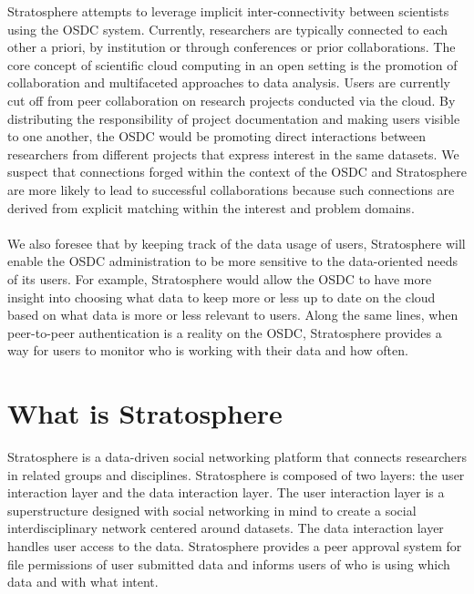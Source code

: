 \begin{multicols*}{2}
Stratosphere attempts to leverage implicit inter-connectivity between
scientists using the OSDC system. Currently, researchers are typically
connected to each other a priori, by institution or through
conferences or prior collaborations. The core concept of scientific
cloud computing in an open setting is the promotion of collaboration
and multifaceted approaches to data analysis. Users are currently cut
off from peer collaboration on research projects conducted via the
cloud. By distributing the responsibility of project documentation and
making users visible to one another, the OSDC would be promoting
direct interactions between researchers from different projects that
express interest in the same datasets. We suspect that connections
forged within the context of the OSDC and Stratosphere are more likely to lead to
successful collaborations because such connections are derived from
explicit matching within the interest and problem domains.
\\
\\
We also foresee that by keeping track of the data usage of users,
Stratosphere will enable the OSDC administration to be more sensitive to the
data-oriented needs of its users. For example, Stratosphere would allow the
OSDC to have more insight into choosing what data to keep more or less
up to date on the cloud based on what data is more or less relevant to users.
Along the same lines, when peer-to-peer authentication is a reality on
the OSDC, Stratosphere provides a way for users to monitor who is
working with their data and how often. 

\section{What is Stratosphere}
\label{sec:what}

Stratosphere is a data-driven social networking platform that connects
researchers in related groups and disciplines. Stratosphere is
composed of two layers: the user interaction layer and the data
interaction layer. The user interaction layer is a superstructure
designed with social networking in mind to create a social
interdisciplinary network centered around datasets. The data
interaction layer handles user access to the data. Stratosphere
provides a peer approval system for file permissions of user submitted
data and informs users of who is using which data and with what
intent.
\vspace{10pt}



\end{multicols*}
